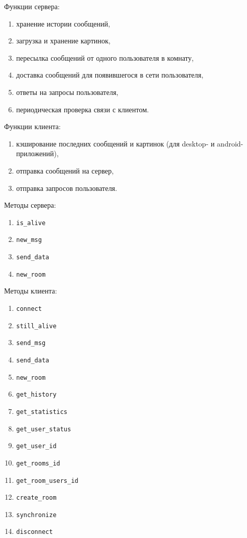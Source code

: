 \documentclass[a4paper,12pt]{extarticle}
\begin{document}
	\noindent
	Функции сервера:
	\begin{enumerate}
		\item хранение истории сообщений,
		\item загрузка и хранение картинок,
		\item пересылка сообщений от одного пользователя в комнату,
		\item доставка сообщений для появившегося в сети пользователя,
		\item ответы на запросы пользователя,
		\item периодическая проверка связи с клиентом.
	\end{enumerate}
	Функции клиента:
	\begin{enumerate}
		\item кэширование последних сообщений и картинок (для desktop- и android-приложений),
		\item отправка сообщений на сервер,
		\item отправка запросов пользователя.
	\end{enumerate}
	Методы сервера:
	\begin{enumerate}
		\item \texttt{is\_alive}
		\item \texttt{new\_msg}
		\item \texttt{send\_data}
		\item \texttt{new\_room}
	\end{enumerate}
	Методы клиента:
	\begin{enumerate}
		\item \texttt{connect}
		\item \texttt{still\_alive}
		\item \texttt{send\_msg}
		\item \texttt{send\_data}
		\item \texttt{new\_room}
		\item \texttt{get\_history}
		\item \texttt{get\_statistics}
		\item \texttt{get\_user\_status}
		\item \texttt{get\_user\_id}
		\item \texttt{get\_rooms\_id}
		\item \texttt{get\_room\_users\_id}
		\item \texttt{create\_room}
		\item \texttt{synchronize}
		\item \texttt{disconnect}
	\end{enumerate}
\end{document}
